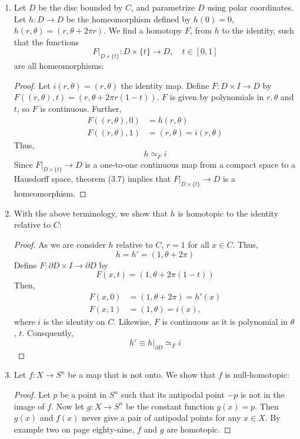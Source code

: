 \documentclass{book}
\begin{document}
\begin{enumerate}[(1)]
    \item Let $D$ be the disc bounded by $C$, and parametrize $D$ using polar coordinates. Let $h: D \rightarrow D$ be the homeomorphism defined by $h(0) = 0$, $h(r, \theta) = (r , \theta + 2\pi r)$. We find a homotopy $F$, from $h$ to the identity, such that the functions
        \[F|_{D \times \{t\}} : D \times \{t\} \rightarrow D, \quad t \in [0,1] \]
        are all homeomorphisms: 
        \begin{proof} Let $i(r,\theta)=(r,\theta)$ the identity map.  Define $F:D\times I\to D$ by $F((r,\theta),t)=(r,\theta+2\pi r(1-t))$.  $F$ is given by polynomials in $r,\theta$ and $t$, so $F$ is continuous.  Further, 
            \begin{align*}
                F((r,\theta),0) & =h(r,\theta) \\
                F((r,\theta),1) & =(r,\theta) = i(r,\theta) 
            \end{align*}
            Thus,
            \[h \simeq_F i\]
            Since $F|_{D\times\{t\}}\to D$ is a one-to-one continuous map from a compact space to a Hausdorff space, theorem ($3.7$) implies that  $F|_{D\times\{t\}}\to D$ is a homeomorphism.
        \end{proof}

    \item With the above terminology, we show that $h$ is homotopic to the identity relative to $C$: 
        \begin{proof} As we are consider $h$ relative to $C$, $r = 1$ for all $x \in C$. Thus, 
            \[h = h' = (1, \theta + 2\pi)\]
            Define $F: \partial D \times I \rightarrow \partial D$ by 
            \[F(x, t)  = (1, \theta + 2\pi(1-t))\]
            Then, 
            \begin{align*}
                F(x,0) & = (1 , \theta + 2\pi) = h'(x) \\
                F(x,1) & = (1, \theta) = i(x), 
            \end{align*}
            where $i$ is the identity on $C$. Likewise, $F$ is continuous as it is polynomial in $\theta$, $t$. Consquently, 
            \[h' \equiv h|_{\partial D} \simeq_F i \]
        \end{proof}

    \item Let $f: X \rightarrow S^n$ be a map that is not onto. We show that $f$ is null-homotopic: 
        \begin{proof} Let $p$ be a point in $S^n$ such that its antipodal point $-p$ is not in the image of $f$.   Now let $g:X\to S^n$ be the constant function $g(x)=p$. Then $g(x)$ and $f(x)$ never give a pair of antipodal points for any $x\in X$.  By example two on page eighty-nine, $f$ and $g$ are homotopic.
        \end{proof}


\end{enumerate}
\end{document}
